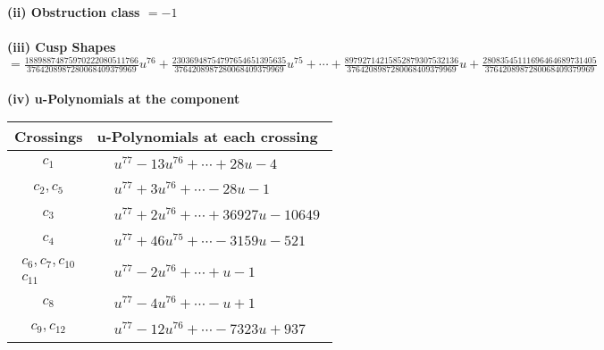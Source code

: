 \documentclass[1p]{elsarticle_modified}
\theoremstyle{definition}
\begin{document}
\flushleft \textbf{(ii) Obstruction class $= -1$}\\~\\
\flushleft \textbf{(iii) Cusp Shapes $= \frac{18898874875970222080511766}{3764208987280068409379969} u^{76}+\frac{23036948754797654651395635}{3764208987280068409379969} u^{75}+\cdots+\frac{89792714215852879307532136}{3764208987280068409379969} u+\frac{28083545111696464689731405}{3764208987280068409379969}$}\\~\\
\newpage\renewcommand{\arraystretch}{1}
\flushleft \textbf{(iv) u-Polynomials at the component}\newline \\
\begin{tabular}{m{50pt}|m{274pt}}
Crossings & \hspace{64pt}u-Polynomials at each crossing \\
\hline $$\begin{aligned}c_{1}\end{aligned}$$&$\begin{aligned}
&u^{77}-13 u^{76}+\cdots+28 u-4
\end{aligned}$\\
\hline $$\begin{aligned}c_{2},c_{5}\end{aligned}$$&$\begin{aligned}
&u^{77}+3 u^{76}+\cdots-28 u-1
\end{aligned}$\\
\hline $$\begin{aligned}c_{3}\end{aligned}$$&$\begin{aligned}
&u^{77}+2 u^{76}+\cdots+36927 u-10649
\end{aligned}$\\
\hline $$\begin{aligned}c_{4}\end{aligned}$$&$\begin{aligned}
&u^{77}+46 u^{75}+\cdots-3159 u-521
\end{aligned}$\\
\hline $$\begin{aligned}c_{6},c_{7},c_{10}\\c_{11}\end{aligned}$$&$\begin{aligned}
&u^{77}-2 u^{76}+\cdots+u-1
\end{aligned}$\\
\hline $$\begin{aligned}c_{8}\end{aligned}$$&$\begin{aligned}
&u^{77}-4 u^{76}+\cdots- u+1
\end{aligned}$\\
\hline $$\begin{aligned}c_{9},c_{12}\end{aligned}$$&$\begin{aligned}
&u^{77}-12 u^{76}+\cdots-7323 u+937
\end{aligned}$\\
\hline
\end{tabular}\\~\\
\end{document}
